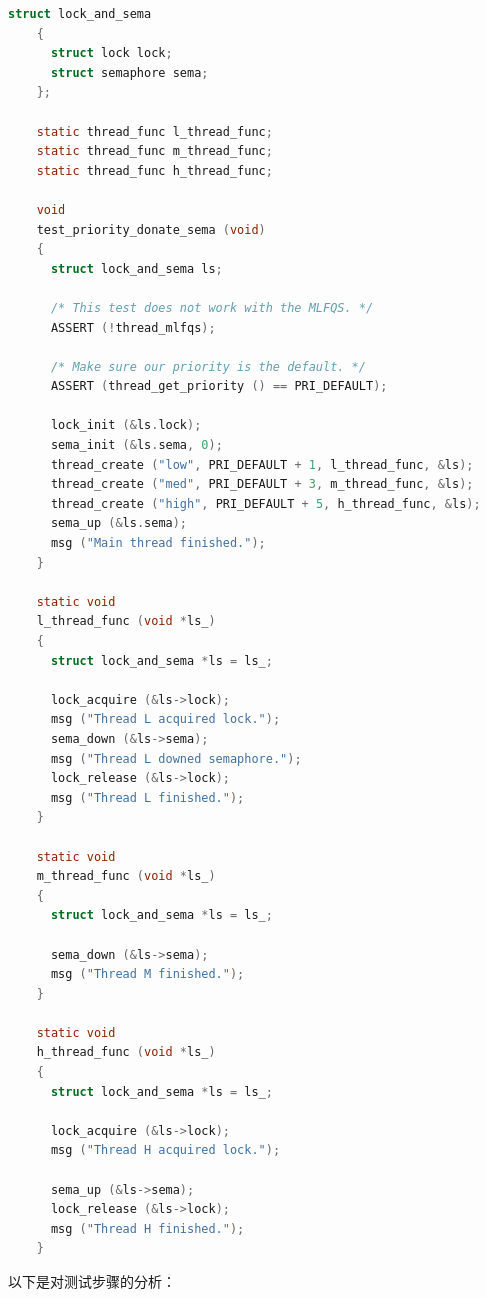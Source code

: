 \documentclass{article}
\begin{document}
\begin{lstlisting}[language=C, title=\texttt{priority-donate-sema}测试]
    struct lock_and_sema 
    {
      struct lock lock;
      struct semaphore sema;
    };

    static thread_func l_thread_func;
    static thread_func m_thread_func;
    static thread_func h_thread_func;

    void
    test_priority_donate_sema (void) 
    {
      struct lock_and_sema ls;

      /* This test does not work with the MLFQS. */
      ASSERT (!thread_mlfqs);

      /* Make sure our priority is the default. */
      ASSERT (thread_get_priority () == PRI_DEFAULT);

      lock_init (&ls.lock);
      sema_init (&ls.sema, 0);
      thread_create ("low", PRI_DEFAULT + 1, l_thread_func, &ls);
      thread_create ("med", PRI_DEFAULT + 3, m_thread_func, &ls);
      thread_create ("high", PRI_DEFAULT + 5, h_thread_func, &ls);
      sema_up (&ls.sema);
      msg ("Main thread finished.");
    }

    static void
    l_thread_func (void *ls_) 
    {
      struct lock_and_sema *ls = ls_;

      lock_acquire (&ls->lock);
      msg ("Thread L acquired lock.");
      sema_down (&ls->sema);
      msg ("Thread L downed semaphore.");
      lock_release (&ls->lock);
      msg ("Thread L finished.");
    }

    static void
    m_thread_func (void *ls_) 
    {
      struct lock_and_sema *ls = ls_;

      sema_down (&ls->sema);
      msg ("Thread M finished.");
    }

    static void
    h_thread_func (void *ls_) 
    {
      struct lock_and_sema *ls = ls_;

      lock_acquire (&ls->lock);
      msg ("Thread H acquired lock.");

      sema_up (&ls->sema);
      lock_release (&ls->lock);
      msg ("Thread H finished.");
    }

\end{lstlisting}

以下是对测试步骤的分析：
\end{document}
